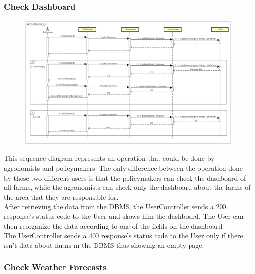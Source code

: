 \newpage
\subsubsection{Check Dashboard}

\begin{figure}[H]
    \begin{center}
        \includegraphics[width=\textwidth]{Images/SequenceDiagrams/CheckDashboardDD.png}
    \end{center}
\end{figure}

This sequence diagram represents an operation that could be done by agronomists and policymakers. 
The only difference between the operation done by these two different users is that the policymakers can check the dashboard 
of all farms, while the agronomists can check only the dashboard about the farms of the area that they are responsible for.\\
After retrieving the data from the DBMS, the UserController sends a 200 response's status code to the User and shows him the dashboard. 
The User can then reorganize the data according to one of the fields on the dashboard.\\
The UserController sends a 400 response's status code to the User only 
if there isn't data about farms in the DBMS thus showing an empty page.


\newpage
\subsubsection{Check Weather Forecasts}

